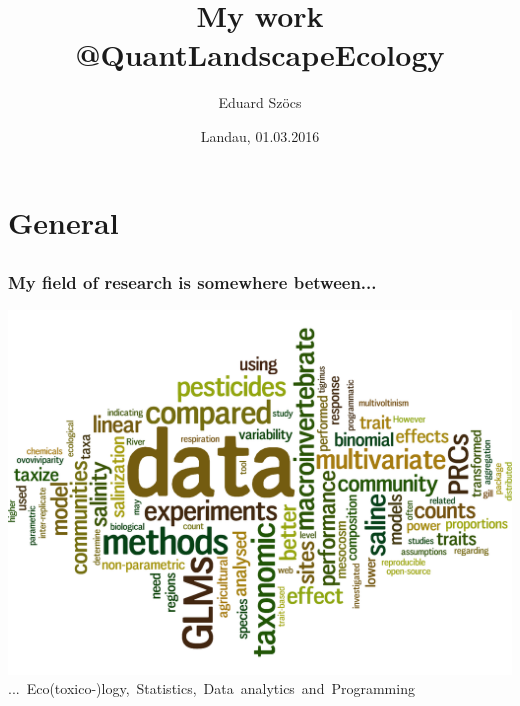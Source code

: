 \documentclass[12pt, t]{beamer}
\title{My work @QuantLandscapeEcology}
\author{Eduard Szöcs}
\institute{Institute for Environmental Sciences, University of Koblenz-Landau}
\date{Landau, 01.03.2016}
\begin{document}
\begin{frame}
\titlepage
\end{frame}


\section{General} 
\subsection{}
\begin{frame}
\frametitle{My field of research is somewhere between...}
\center
\includegraphics[width =.8\textwidth]{fig/wordcloud_abstracts_firstauthor.png} \\	
\mbox{... Eco(toxico-)logy, Statistics, Data analytics and Programming}
\end{frame}
\end{document}

